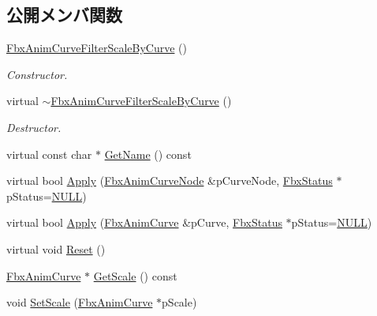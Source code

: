 \subsection*{公開メンバ関数}
\begin{DoxyCompactItemize}
\item 
\hyperlink{class_fbx_anim_curve_filter_scale_by_curve_a88a350e3639a1fcb3aa29a071fe0fa71}{Fbx\+Anim\+Curve\+Filter\+Scale\+By\+Curve} ()
\begin{DoxyCompactList}\small\item\em Constructor. \end{DoxyCompactList}\item 
virtual \hyperlink{class_fbx_anim_curve_filter_scale_by_curve_a400e5f8cc518a9facd7b2ba452e55a78}{$\sim$\+Fbx\+Anim\+Curve\+Filter\+Scale\+By\+Curve} ()
\begin{DoxyCompactList}\small\item\em Destructor. \end{DoxyCompactList}\item 
virtual const char $\ast$ \hyperlink{class_fbx_anim_curve_filter_scale_by_curve_a99e99cf6db71774d394010c4cd295fdb}{Get\+Name} () const
\item 
virtual bool \hyperlink{class_fbx_anim_curve_filter_scale_by_curve_ac27bdff4d17273d2a767d188436e53f8}{Apply} (\hyperlink{class_fbx_anim_curve_node}{Fbx\+Anim\+Curve\+Node} \&p\+Curve\+Node, \hyperlink{class_fbx_status}{Fbx\+Status} $\ast$p\+Status=\hyperlink{fbxarch_8h_a070d2ce7b6bb7e5c05602aa8c308d0c4}{N\+U\+LL})
\item 
virtual bool \hyperlink{class_fbx_anim_curve_filter_scale_by_curve_a3914c0e65233ce6f2177d5d7e65c15ea}{Apply} (\hyperlink{class_fbx_anim_curve}{Fbx\+Anim\+Curve} \&p\+Curve, \hyperlink{class_fbx_status}{Fbx\+Status} $\ast$p\+Status=\hyperlink{fbxarch_8h_a070d2ce7b6bb7e5c05602aa8c308d0c4}{N\+U\+LL})
\item 
virtual void \hyperlink{class_fbx_anim_curve_filter_scale_by_curve_afa7aab42520287edf327d78dcbbb0d01}{Reset} ()
\item 
\hyperlink{class_fbx_anim_curve}{Fbx\+Anim\+Curve} $\ast$ \hyperlink{class_fbx_anim_curve_filter_scale_by_curve_a966f86d57bd088700341223a85fe27a0}{Get\+Scale} () const
\item 
void \hyperlink{class_fbx_anim_curve_filter_scale_by_curve_afe876ca9b9d674e62b9b7a3839adeef0}{Set\+Scale} (\hyperlink{class_fbx_anim_curve}{Fbx\+Anim\+Curve} $\ast$p\+Scale)
\end{DoxyCompactItemize}
